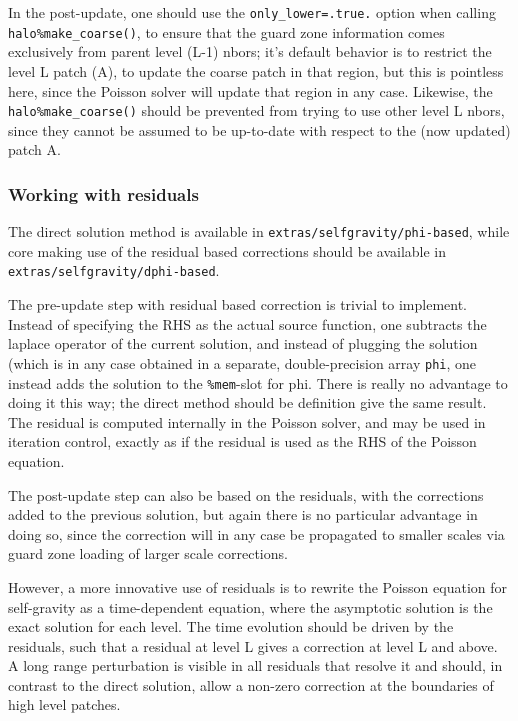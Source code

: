 \documentclass[paper=a4,fontsize=11pt]{scrartcl}
\numberwithin{equation}{section}		%
\numberwithin{figure}{section}			%
\numberwithin{table}{section}				%
\begin{document}
In the post-update, one should use the \verb|only_lower=.true.| option when calling \verb|halo%make_coarse()|, to ensure that the guard zone information comes exclusively from parent level (L-1) nbors; it's default behavior is to restrict the level L patch (A), to update the coarse patch in that region, but this is pointless here, since the Poisson solver will update that region in any case. Likewise, the \verb|halo%make_coarse()| should be prevented from trying to use other level L nbors, since they cannot be assumed to be up-to-date with respect to the (now updated) patch A.

\subsubsection{Working with residuals}
The direct solution method is available in \verb|extras/selfgravity/phi-based|, while core making use of the residual based corrections should be available in \verb|extras/selfgravity/dphi-based|.

The pre-update step with residual based correction is trivial to implement.  Instead of specifying the RHS as the actual source function, one subtracts the laplace operator of the current solution, and instead of plugging the solution (which is in any case obtained in a separate, double-precision array \verb|phi|, one instead adds the solution to the \verb|%mem|-slot for phi.  There is really no advantage to doing it this way; the direct method should be definition give the same result.  The residual is computed internally in the Poisson solver, and may be used in iteration control, exactly as if the residual is used as the RHS of the Poisson equation.

The post-update step can also be based on the residuals, with the corrections added to the previous solution, but again there is no particular advantage in doing so, since the correction will in any case be propagated to smaller scales via guard zone loading of larger scale corrections.

However, a more innovative use of residuals is to rewrite the Poisson equation for self-gravity as a time-dependent equation, where the asymptotic solution is the exact solution for each level.  The time evolution should be driven by the residuals, such that a residual at level L gives a correction at level L and above.  A long range perturbation is visible in all residuals that resolve it and should, in contrast to the direct solution, allow a non-zero correction at the boundaries of high level patches.
\end{document}
